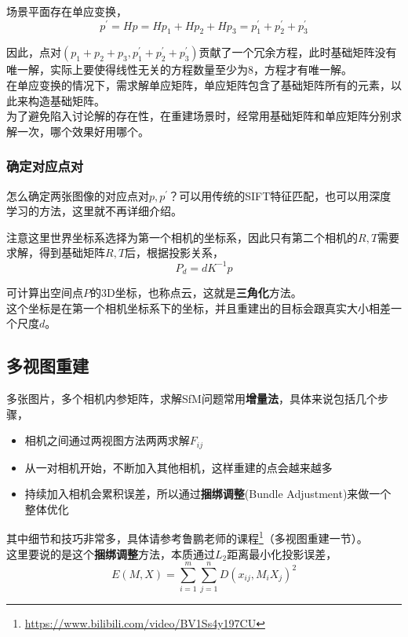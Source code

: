		场景平面存在单应变换，
		$$
			p^\prime = Hp = Hp_1 + Hp_2 + Hp_3 = p^\prime_1+p^\prime_2+p^\prime_3
		$$

		因此，点对$(p_1 + p_2 + p_3,p^\prime_1+p^\prime_2+p^\prime_3)$贡献了一个冗余方程，此时基础矩阵没有唯一解，实际上要使得线性无关的方程数量至少为8，方程才有唯一解。\\

		在单应变换的情况下，需求解单应矩阵，单应矩阵包含了基础矩阵所有的元素，以此来构造基础矩阵。\\

		为了避免陷入讨论解的存在性，在重建场景时，经常用基础矩阵和单应矩阵分别求解一次，哪个效果好用哪个。

	\subsubsection*{确定对应点对}
		怎么确定两张图像的对应点对$p,p^{\prime}$？可以用传统的SIFT特征匹配，也可以用深度学习的方法，这里就不再详细介绍。

	
	注意这里世界坐标系选择为第一个相机的坐标系，因此只有第二个相机的$R,T$需要求解，得到基础矩阵$R,T$后，根据投影关系，
	$$
		P_d = dK^{-1}p
	$$

	可计算出空间点$P$的3D坐标，也称点云，这就是\textbf{三角化}方法。\\

	这个坐标是在第一个相机坐标系下的坐标，并且重建出的目标会跟真实大小相差一个尺度$d$。

	\subsection{多视图重建}
		多张图片，多个相机内参矩阵，求解SfM问题常用\textbf{增量法}，具体来说包括几个步骤，
	
	\begin{itemize}
		\item 相机之间通过两视图方法两两求解$F_{ij}$
		\item 从一对相机开始，不断加入其他相机，这样重建的点会越来越多
		\item 持续加入相机会累积误差，所以通过\textbf{捆绑调整}(Bundle Adjustment)来做一个整体优化
	\end{itemize}

	其中细节和技巧非常多，具体请参考鲁鹏老师的课程\footnote{\url{https://www.bilibili.com/video/BV1Ss4y197CU}}（多视图重建一节）。\\

	这里要说的是这个\textbf{捆绑调整}方法，本质通过$L_2$距离最小化投影误差，
	$$
		E(M,X) = \sum_{i=1}^m \sum_{j=1}^n D\left(x_{ij}, M_iX_j\right)^2
	$$

